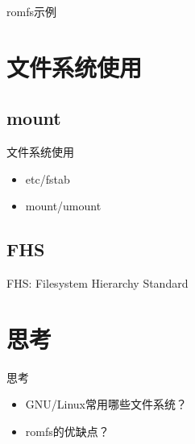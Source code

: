 \begin{frame}{romfs示例}
\begin{center}\end{center}
\end{frame}


\section{文件系统使用}
\subsection{mount}
\begin{frame}{文件系统使用}
\begin{itemize}
\item etc/fstab
\item mount/umount
\end{itemize}
\end{frame}

\subsection{FHS}
\begin{frame}{FHS: Filesystem Hierarchy Standard}
\begin{center}\end{center}
\end{frame}

 \section{思考}
 \begin{frame}{思考}
 \begin{itemize}
 \item GNU/Linux常用哪些文件系统？
 \item romfs的优缺点？
 \end{itemize}
 \end{frame}




